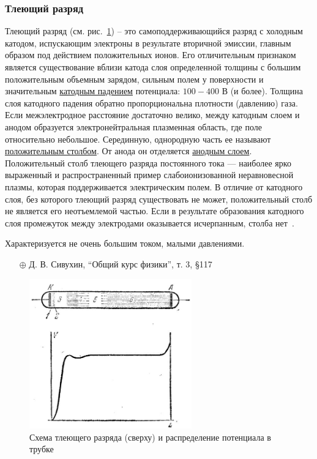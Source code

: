 \documentclass[10pt, a4paper]{article}
\begin{document}
\subsubsection{Тлеющий разряд}

Тлеющий разряд (см. рис.~\ref{fig:glow_discharge}) -- это самоподдерживающийся разряд с холодным катодом, испускающим электроны в результате вторичной эмиссии, главным образом под действием положительных ионов. Его отличительным признаком является существование вблизи катода слоя определенной толщины с большим положительным объемным зарядом, сильным полем у поверхности и значительным \uline{катодным падением} потенциала: $100-400$ В (и более). Толщина слоя катодного падения обратно пропорциональна плотности (давлению) газа. Если межэлектродное расстояние достаточно велико, между катодным слоем и анодом образуется электронейтральная плазменная область, где поле относительно небольшое. Серединную, однородную часть ее называют \uline{положительным столбом}. От анода он отделяется \uline{анодным слоем}. Положительный столб тлеющего разряда постоянного тока — наиболее ярко выраженный и распространенный пример слабоионизованной неравновесной плазмы, которая поддерживается электрическим полем. В отличие от катодного слоя, без которого тлеющий разряд существовать не может, положительный столб не является его неотъемлемой частью. Если в результате образования катодного слоя промежуток между электродами оказывается исчерпанным, столба нет~\cite{raizer}.

Характеризуется не очень большим током, малыми давлениями.

\begin{itemize}
	\item[$\oplus$] Д. В. Сивухин, ``Общий курс физики'', т. 3, \S 117
\end{itemize}

\begin{figure}[ht]
	\begin{center}
		\includegraphics[width=70mm]{12.1.JPG}
	\end{center}
	\caption{Схема тлеющего разряда (сверху) и распределение потенциала в трубке}
	\label{fig:glow_discharge}
\end{figure}
\end{document}
